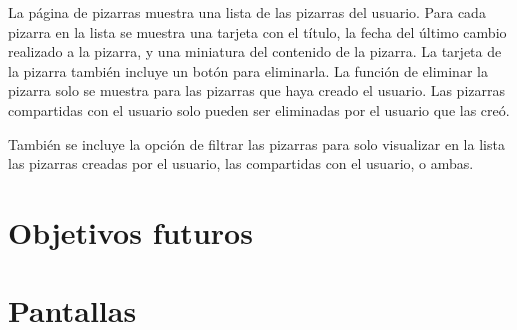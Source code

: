 \documentclass[a4paper, oneside, final]{scrartcl}
\begin{document}
La página de pizarras muestra una lista de las pizarras del usuario. Para cada pizarra en la lista se muestra una tarjeta con el título, la fecha del último cambio realizado a la pizarra, y una miniatura del contenido de la pizarra. La tarjeta de la pizarra también incluye un botón para eliminarla. La función de eliminar la pizarra solo se muestra para las pizarras que haya creado el usuario. Las pizarras compartidas con el usuario solo pueden ser eliminadas por el usuario que las creó. 

También se incluye la opción de filtrar las pizarras para solo visualizar en la lista las pizarras creadas por el usuario, las compartidas con el usuario, o ambas.

  
\section{Objetivos futuros}

\section{Pantallas}
\end{document}

